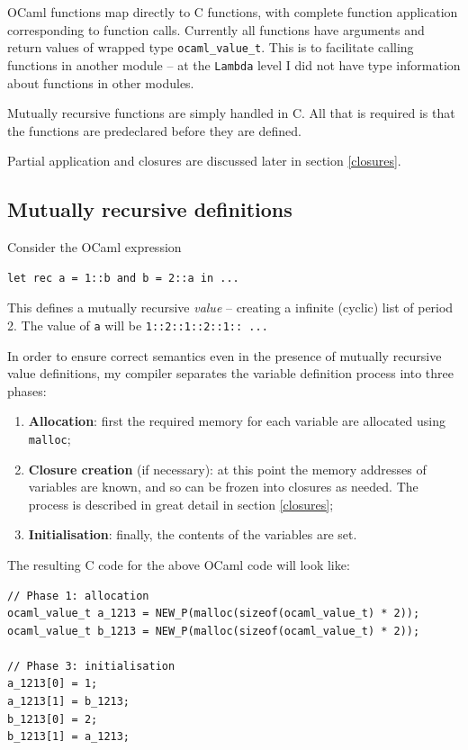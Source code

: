 \documentclass[12pt,a4paper,twoside,openright]{report}
\begin{document}
OCaml functions map directly to C functions, with complete function application
corresponding to function calls. Currently all functions have arguments and
return values of wrapped type \lstinline!ocaml_value_t!. This is to facilitate
calling functions in another module -- at the \lstinline!Lambda! level I did
not have type information about functions in other modules.

Mutually recursive functions are simply handled in C. All that is required is
that the functions are predeclared before they are defined.

Partial application and closures are discussed later in section \ref{closures}.

\subsection{Mutually recursive definitions}\label{mutually-recursive-values}

Consider the OCaml expression

\begin{lstlisting}
let rec a = 1::b and b = 2::a in ...
\end{lstlisting}

This defines a mutually recursive \textit{value} -- creating a infinite
(cyclic) list of period 2. The value of \lstinline!a! will be
\lstinline!1::2::1::2::1:: ...!

In order to ensure correct semantics even in the presence of mutually recursive
value definitions, my compiler separates the variable definition process into
three phases:

\begin{enumerate}
  \item \textbf{Allocation}: first the required memory for each variable are
    allocated using \lstinline!malloc!;
  \item \textbf{Closure creation} (if necessary): at this point the memory
    addresses of variables are known, and so can be frozen into closures as
    needed. The process is described in great detail in section \ref{closures};
  \item \textbf{Initialisation}: finally, the contents of the variables are
    set.
\end{enumerate}

The resulting C code for the above OCaml code will look like:

\begin{lstlisting}
// Phase 1: allocation
ocaml_value_t a_1213 = NEW_P(malloc(sizeof(ocaml_value_t) * 2));
ocaml_value_t b_1213 = NEW_P(malloc(sizeof(ocaml_value_t) * 2));

// Phase 3: initialisation
a_1213[0] = 1;
a_1213[1] = b_1213;
b_1213[0] = 2;
b_1213[1] = a_1213;
\end{lstlisting}
\end{document}
